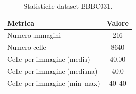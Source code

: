 \begin{table}[ht]
\centering
\caption{Statistiche dataset BBBC031.}
\label{tab:bbbc031_stats}
\begin{tabular}{lc}
\toprule
Metrica & Valore \\
\midrule
Numero immagini & 216 \\
Numero celle & 8640 \\
Celle per immagine (media) & 40.00 \\
Celle per immagine (mediana) & 40.0 \\
Celle per immagine (min--max) & 40--40 \\
\bottomrule
\end{tabular}
\end{table}
